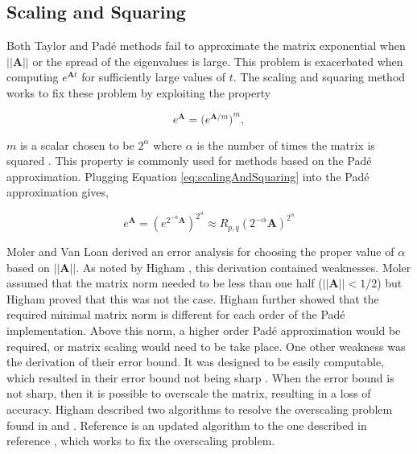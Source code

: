 \subsection{Scaling and Squaring}
Both Taylor and Pad\'e methods fail to approximate the matrix exponential when $||\boldsymbol{A}||$ or the spread of the eigenvalues is large. This problem is exacerbated when computing $e^{\boldsymbol{A}t}$ for sufficiently large values of $t$. The scaling and squaring method works to fix these problem by exploiting the property

\begin{equation*}
    e^{\boldsymbol{A}} = \big( e^{\boldsymbol{A}/m}\big)^{m}
    \label{eq:scalingAndSquaring},
\end{equation*}

\noindent $m$ is a scalar chosen to be $2^{\alpha}$ where $\alpha$ is the number of times the matrix is squared \cite{moler2003}. This property is commonly used for methods based on the Pad\'e approximation. Plugging Equation \ref{eq:scalingAndSquaring} into the Pad\'e approximation gives,

\begin{equation}
    e^{\boldsymbol{A}} = (e^{2^{-\alpha}\boldsymbol{A}})^{2^{\alpha}} \approx R_{p,q}(2^{-\alpha}\boldsymbol{A})^{2^{\alpha}}
\end{equation}

Moler and Van Loan \cite{moler2003} derived an error analysis for choosing the proper value of $\alpha$ based on $||\boldsymbol{A}||$. As noted by Higham \cite{higham2005}, this derivation contained weaknesses. Moler assumed that the matrix norm needed to be less than one half ($||\boldsymbol{A}|| < 1/2$) but Higham proved that this was not the case. Higham further showed that the required minimal matrix norm is different for each order of the Pad\'e implementation. Above this norm, a higher order Pad\'e approximation would be required, or matrix scaling would need to be take place. One other weakness was the derivation of their error bound. It was designed to be easily computable, which resulted in their error bound not being sharp \cite{higham2005}. When the error bound is not sharp, then it is possible to overscale the matrix, resulting in a loss of accuracy. Higham described two algorithms to resolve the overscaling problem found in \cite{higham2005} and \cite{higham2009}. Reference \cite{higham2009} is an updated algorithm to the one described in reference \cite{higham2005}, which works to fix the overscaling problem. 

